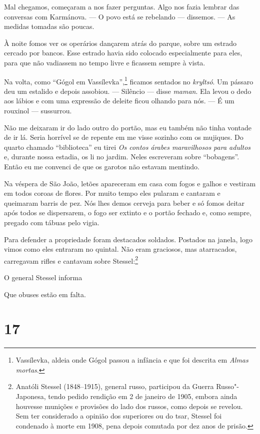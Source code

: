 Mal chegamos, começaram a nos fazer perguntas. Algo nos fazia lembrar
das conversas com Karmánova. --- O povo está se rebelando --- dissemos.
--- As medidas tomadas são poucas.

À noite fomos ver os operários dançarem atrás do parque, sobre um
estrado cercado por bancos. Esse estrado havia sido colocado
especialmente para eles, para que não vadiassem no tempo livre e
ficassem sempre à vista.

Na volta, como ``Gógol em Vassílevka'',\footnote{Vassílevka, aldeia onde
  Gógol passou a infância e que foi descrita em \emph{Almas mortas}.}
ficamos sentados no \emph{kryltsó}. Um pássaro deu um estalido e depois
assobiou. --- Silêncio --- disse \emph{maman}. Ela levou o dedo aos
lábios e com uma expressão de deleite ficou olhando para nós. --- É um
rouxinol --- sussurrou.

Não me deixaram ir do lado outro do portão, mas eu também não tinha
vontade de ir lá. Seria horrível se de repente em me visse sozinho com
os mujiques. Do quarto chamado ``biblioteca'' eu tirei \emph{Os contos
árabes maravilhosos para adultos} e, durante nossa estadia, os li no
jardim. Neles escreveram sobre ``bobagens''. Então eu me convenci de que
os garotos não estavam mentindo.

Na véspera de São João, letões apareceram em casa com fogos e galhos e
vestiram em todos coroas de flores. Por muito tempo eles pularam e
cantaram e queimaram barris de pez. Nós lhes demos cerveja para beber e
só fomos deitar após todos se dispersarem, o fogo ser extinto e o portão
fechado e, como sempre, pregado com tábuas pelo vigia.

Para defender a propriedade foram destacados soldados. Postados na
janela, logo vimos como eles entraram no quintal. Não eram graciosos,
mas atarracados, carregavam rifles e cantavam sobre Stessel:\footnote{Anatóli
  Stessel (1848--1915), general russo, participou da Guerra
  Russo"-Japonesa, tendo pedido rendição em 2 de janeiro de 1905, embora
  ainda houvesse munições e provisões do lado dos russos, como depois se
  revelou. Sem ter considerado a opinião dos superiores ou do tsar,
  Stessel foi condenado à morte em 1908, pena depois comutada por dez
  anos de prisão.}

O general Stessel informa

Que obuses estão em falta.

\section{17}

